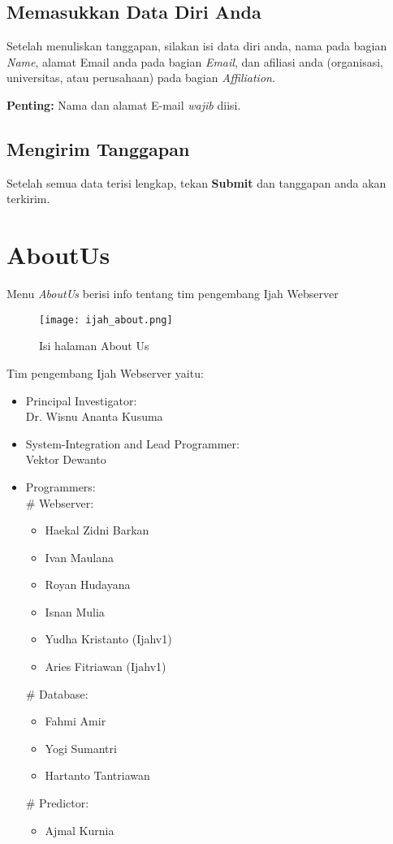 	\subsection{Memasukkan Data Diri Anda} \label{personal data}
	Setelah menuliskan tanggapan, silakan isi data diri anda, nama pada bagian \emph{Name}, alamat E\-mail anda pada bagian \emph{E\-mail}, dan afiliasi anda (organisasi, universitas, atau perusahaan) pada bagian \emph{Affiliation}.

	\textbf{Penting:} Nama dan alamat E-mail \emph{wajib} diisi. 

	\subsection{Mengirim Tanggapan} \label{submit}
	Setelah semua data terisi lengkap, tekan \textbf{Submit} dan tanggapan anda akan terkirim.

\section{AboutUs}

Menu \emph{AboutUs} berisi info tentang tim pengembang Ijah Webserver

\begin{figure}[H]
	\centering
	\texttt{[image: ijah\_about.png]}
	\caption{Isi halaman About Us}
	\label{fig:ijah_about}
\end{figure}

Tim pengembang Ijah Webserver yaitu:

\begin{itemize}
\item Principal Investigator:\\ 
Dr. Wisnu Ananta Kusuma

\item System-Integration and Lead Programmer:\\
Vektor Dewanto

\item Programmers:\\
\# Webserver:
\begin{itemize}
\item Haekal Zidni Barkan
\item Ivan Maulana
\item Royan Hudayana
\item Isnan Mulia
\item Yudha Kristanto (Ijahv1)
\item Aries Fitriawan (Ijahv1)
\end{itemize}
\# Database:
\begin{itemize}
\item Fahmi Amir
\item Yogi Sumantri
\item Hartanto Tantriawan
\end{itemize}
\# Predictor:
\begin{itemize}
\item Ajmal Kurnia
\end{itemize}
\end{itemize}

